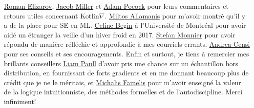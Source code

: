 \href{https://medium.com/@elizarov}{Roman Elizarov}, \href{https://cquic.unm.edu/member/jacob.miller/}{Jacob Miller} et \href{http://www.adampocock.com/}{Adam Pocock} pour leurs commentaires et retours utiles concernant Kotlin$\nabla$. \href{https://miltos.allamanis.com/}{Miltos Allamanis} pour m'avoir montré qu'il y a de la place pour SE en ML. \href{https://diro.umontreal.ca/accueil/}{Celine Begin} à l'Universit\'e de Montr\'eal pour avoir aidé un étranger la veille d'un hiver froid en 2017. \href{https://www.iro.umontreal.ca/~monnier/}{Stefan Monnier} pour avoir répondu de manière réfléchie et approfondie à mes courriels errants. \href{https://censi.science/}{Andrea Censi} pour ses conseils et ses encouragements. Enfin et surtout, je tiens à remercier mes brillants conseillers \href{http://liampaull.ca/}{Liam Paull} d'avoir pris une chance sur un échantillon hors distribution, en fournissant de forts gradients et en me donnant beaucoup plus de crédit que je ne le méritais, et \href{https://michalis.famelis.info/}{Michalis Famelis} pour m'avoir enseigné la valeur de la logique intuitionniste, des méthodes formelles et de l'autodiscipline. Merci infiniment!
